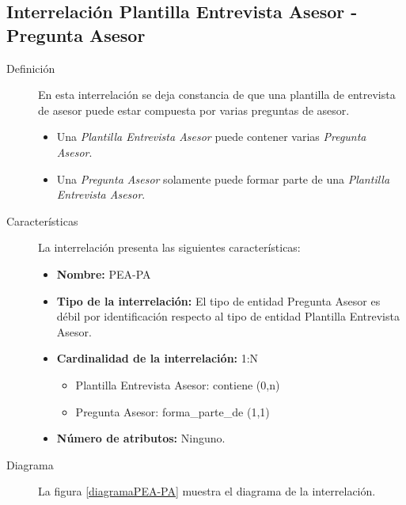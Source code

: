 \subsection{Interrelación Plantilla Entrevista Asesor - Pregunta Asesor}

   \begin{description}
      \item[Definición] En esta interrelación se deja constancia de que una
      plantilla de entrevista de asesor puede estar compuesta por varias
      preguntas de asesor.

      \begin{itemize}
       \item Una \textit{Plantilla Entrevista Asesor} puede contener varias
             \textit{Pregunta Asesor}.
       \item Una \textit{Pregunta Asesor} solamente puede formar parte de una
             \textit{Plantilla Entrevista Asesor}.
      \end{itemize}

      \item[Características] La interrelación presenta las siguientes
                             características:

         \begin{itemize}
            \item \textbf{Nombre:} PEA-PA
            \item \textbf{Tipo de la interrelación:} El tipo de entidad Pregunta
                  Asesor es débil por identificación respecto al tipo de
                  entidad Plantilla Entrevista Asesor.
            \item \textbf{Cardinalidad de la interrelación:} 1:N
                  \begin{itemize}
                     \item Plantilla Entrevista Asesor: contiene (0,n)
                     \item Pregunta Asesor: forma\_parte\_de (1,1)
                  \end{itemize}
            \item \textbf{Número de atributos:} Ninguno.
         \end{itemize}

      \item[Diagrama] La figura \ref{diagramaPEA-PA} muestra el diagrama de la
                      interrelación.


\end{description}
